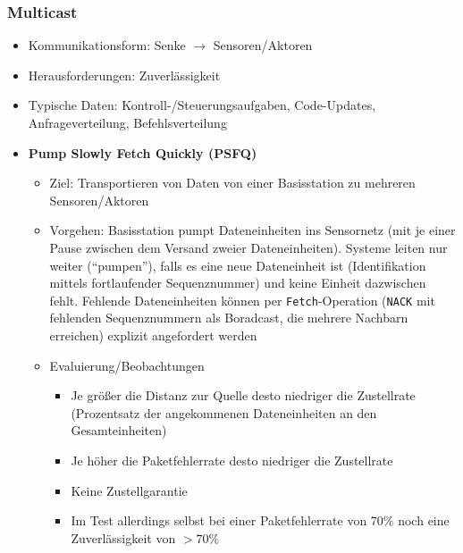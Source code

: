 \subsubsection{Multicast}
\begin{itemize}
	\item Kommunikationsform: Senke \(\rightarrow\) Sensoren/Aktoren
	\item Herausforderungen: Zuverlässigkeit
	\item Typische Daten: Kontroll-/Steuerungsaufgaben, Code-Updates, Anfrageverteilung, Befehlsverteilung
	\item \textbf{Pump Slowly Fetch Quickly (PSFQ)}
	\begin{itemize}
		\item Ziel: Transportieren von Daten von einer Basisstation zu mehreren Sensoren/Aktoren
		\item Vorgehen: Basisstation pumpt Dateneinheiten ins Sensornetz (mit je einer Pause zwischen dem Versand zweier Dateneinheiten). Systeme leiten nur weiter ("`pumpen"'), falls es eine neue Dateneinheit ist (Identifikation mittels fortlaufender Sequenznummer) und keine Einheit dazwischen fehlt. Fehlende Dateneinheiten können per \texttt{Fetch}-Operation (\texttt{NACK} mit fehlenden Sequenznummern als Boradcast, die mehrere Nachbarn erreichen) explizit angefordert werden
		\item Evaluierung/Beobachtungen
		\begin{itemize}
			\item Je größer die Distanz zur Quelle desto niedriger die Zustellrate (Prozentsatz der angekommenen Dateneinheiten an den Gesamteinheiten)
			\item Je höher die Paketfehlerrate desto niedriger die Zustellrate
			\item Keine Zustellgarantie
			\item Im Test allerdings selbst bei einer Paketfehlerrate von \(70\%\) noch eine Zuverlässigkeit von \(>70\%\)
		\end{itemize}
	\end{itemize}
\end{itemize}

